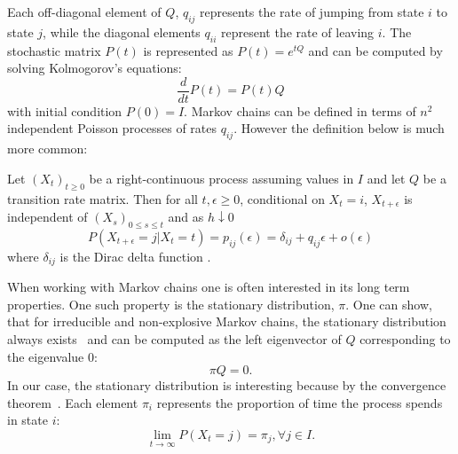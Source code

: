 Each off-diagonal element of $Q$, $q_{ij}$ represents the rate of jumping from state $i$ to state $j$,
while the diagonal elements $q_{ii}$ represent the rate of leaving $i$. The stochastic matrix
$P(t)$ is represented as $P(t) = e^{tQ}$ and can be computed by solving Kolmogorov's equations:
\begin{equation}
	\nonumber
	\frac{d}{dt}P(t) = P(t)Q
\end{equation}
with initial condition $P(0) = I$.
%
Markov chains can be defined in terms of $n^2$ independent Poisson processes
of rates $q_{ij}$. However the definition below is much more common:%
\begin{defn}
	\label{def:ctmc}
	Let $(X_t)_{t \ge 0}$ be a right-continuous process assuming values in $I$ and let $Q$
	be a transition rate matrix. Then for all $t, \epsilon \ge 0$, conditional on $X_t = i$,
	$X_{t+\epsilon}$ is independent of $(X_s)_{0 \le s \le t}$ and as $h \downarrow 0$
	\begin{equation}
		\nonumber
		P(X_{t+\epsilon} = j | X_t = t) = p_{ij}(\epsilon) = \delta_{ij} + q_{ij}\epsilon + o(\epsilon)
	\end{equation}
	where $\delta_{ij}$ is the Dirac delta function \cite{norris1998markov}.
\end{defn}
When working with Markov
chains one is often interested in its long term properties. One such property is the
stationary distribution, $\pi$. One can show, that for irreducible and non-explosive Markov chains,
the stationary distribution always exists~\cite{norris1998markov} and can be computed as the left eigenvector of $Q$ 
corresponding to the eigenvalue $0$:
\begin{equation}
	\nonumber
	\pi Q = 0.
\end{equation}
In our case, the stationary distribution is interesting because by the convergence theorem~\cite{aldous-fill-2014}.
Each element $\pi_i$ represents the proportion of time the process spends in state $i$:
\begin{equation}
	\nonumber
	\lim\limits_{t \rightarrow \infty} P(X_t = j) = \pi_j, \forall j \in I.
\end{equation}

